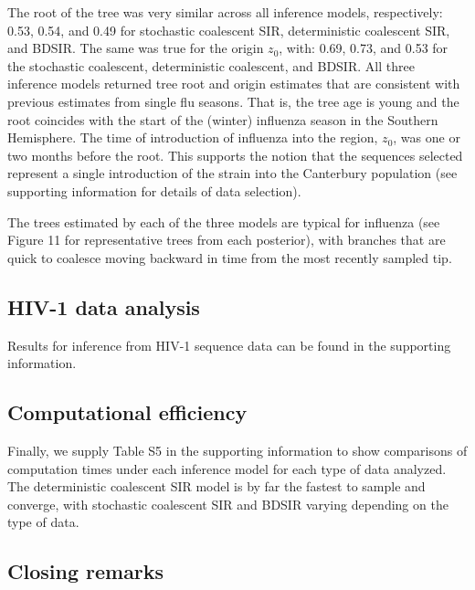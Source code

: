 \documentclass[12pt,titlepage]{article}
\newcommand{\stochCoalSIR}{stochastic coalescent SIR}
\newcommand{\deterCoalSIR}{deterministic coalescent SIR}
\newcommand{\BDSIR}{BDSIR}
\begin{document}
The root of the tree was very similar across all inference models,
respectively:  0.53, 0.54, and 0.49 for stochastic coalescent SIR,
deterministic coalescent SIR, and BDSIR.  The same was true for the origin $z_0$, with:  0.69, 0.73, and 0.53 for the stochastic coalescent, deterministic coalescent, and BDSIR.
All three inference models returned tree root and origin estimates that
are consistent with previous estimates from single flu seasons.  That
is, the tree age is young and the root coincides with the start of the (winter) influenza season in the Southern Hemisphere.  
The time of introduction of influenza into the region, $z_0$, was one or two months before the root.  This supports the notion that the sequences selected represent a single introduction of the strain into the Canterbury population (see supporting information for details of data selection).

The trees estimated by each of the three models are
typical for influenza (see Figure 11 for representative trees from each posterior), with branches that are quick to coalesce moving backward
in time from the most recently sampled tip.

\subsection{HIV-1 data analysis}  

Results for inference from HIV-1 sequence data can be found in the supporting information.

\subsection{Computational efficiency}  Finally, we supply Table S5 in the supporting information to show comparisons of computation times under each inference model for each type of data analyzed.  
The \deterCoalSIR{} model is by far the fastest to sample and converge, with \stochCoalSIR{} and \BDSIR{} varying depending on the type of data.

\subsection{Closing remarks}
\end{document}

